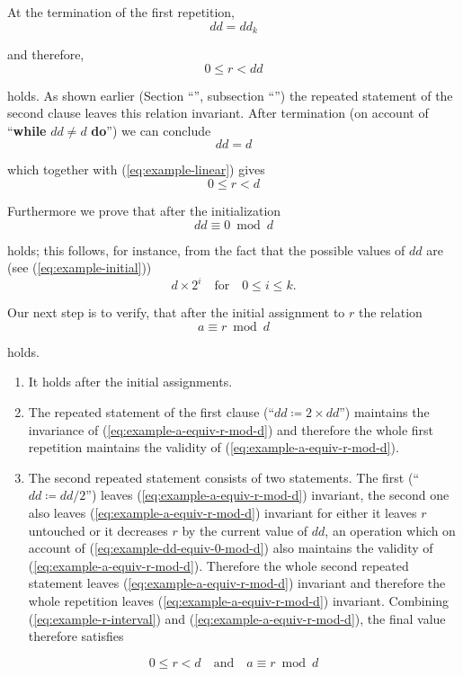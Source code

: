 At the termination of the first repetition,
$$
dd=dd_k
$$

\noindent
and therefore,
\begin{equation}
	\label{eq:example-linear}
	0 \leqslant r <dd
\end{equation}

\noindent
holds. As shown earlier (Section ``'', subsection ``'') the repeated statement of the second clause leaves this relation invariant. After termination (on account of ``\textbf{while} $dd \neq d$ \textbf{do}'') we can
conclude
$$
dd = d
$$

\noindent
which together with (\ref{eq:example-linear}) gives
\begin{equation}
	\label{eq:example-r-interval}
	0 \leqslant r < d
\end{equation}

Furthermore we prove that after the initialization
\begin{equation}
	\label{eq:example-dd-equiv-0-mod-d}
	dd \equiv 0 \bmod d
\end{equation}

\noindent
holds; this follows, for instance, from the fact that the possible values of $dd$ are (see (\ref{eq:example-initial}))
$$
d\times 2^i\quad \text{for}\quad 0 \leqslant i \leqslant k.
$$

Our next step is to verify, that after the initial assignment to $r$ the relation
\begin{equation}
	\label{eq:example-a-equiv-r-mod-d}
	a \equiv r \bmod d
\end{equation}

\noindent
holds.

\begin{enumerate}[wide, nosep, label=(\arabic*)]
	\item It holds after the initial assignments.
	\item The repeated statement of the first clause (``$dd \coloneq 2\times dd$'') maintains the invariance of (\ref{eq:example-a-equiv-r-mod-d}) and therefore the whole first repetition maintains the validity of (\ref{eq:example-a-equiv-r-mod-d}). 
	\item The second repeated statement consists of two statements. The first (``$dd \coloneq dd/2$'') leaves (\ref{eq:example-a-equiv-r-mod-d}) invariant, the second one also leaves (\ref{eq:example-a-equiv-r-mod-d}) invariant for either it leaves $r$ untouched or it decreases $r$ by the current value of $dd$, an operation which on account of (\ref{eq:example-dd-equiv-0-mod-d}) also maintains the validity of (\ref{eq:example-a-equiv-r-mod-d}). Therefore the whole second repeated statement leaves (\ref{eq:example-a-equiv-r-mod-d}) invariant and therefore the whole repetition leaves (\ref{eq:example-a-equiv-r-mod-d}) invariant. Combining (\ref{eq:example-r-interval}) and (\ref{eq:example-a-equiv-r-mod-d}), the final value	therefore satisfies
\end{enumerate}
\medskip
$$
0 \leqslant r < d\quad \text{and}\quad a \equiv r \bmod d
$$


